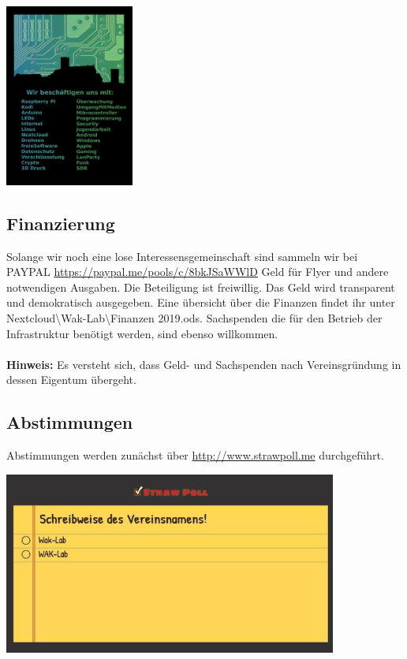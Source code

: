 \begin{minipage}[t]{0.5\textwidth}
  \centering
  \includegraphics[height=6cm]{pictures/FlyerRueckseite.jpg}
  \label{img:FlyerRueckseite}
\end{minipage}

\subsection{Finanzierung}
Solange wir noch eine lose Interessensgemeinschaft sind sammeln wir bei PAYPAL \url{https://paypal.me/pools/c/8bkJSaWWlD} Geld für Flyer und andere notwendigen Ausgaben. Die Beteiligung ist freiwillig. Das Geld wird transparent und demokratisch ausgegeben. Eine übersicht über die Finanzen findet ihr unter Nextcloud\textbackslash Wak-Lab\textbackslash Finanzen 2019.ods. Sachspenden die für den Betrieb der Infrastruktur benötigt werden, sind ebenso willkommen. \\
\ \\
\textbf{Hinweis:} Es versteht sich, dass Geld- und Sachspenden nach Vereinsgründung in dessen Eigentum übergeht.\\

\subsection{Abstimmungen}
Abstimmungen werden zunächst über \url{http://www.strawpoll.me} durchgeführt.\\

\begin{minipage}[t]{\textwidth}
  \centering
  \includegraphics[height=6cm]{pictures/StrawPoll.png}
  \label{img:StrawPoll}
\end{minipage}


\newpage

 

